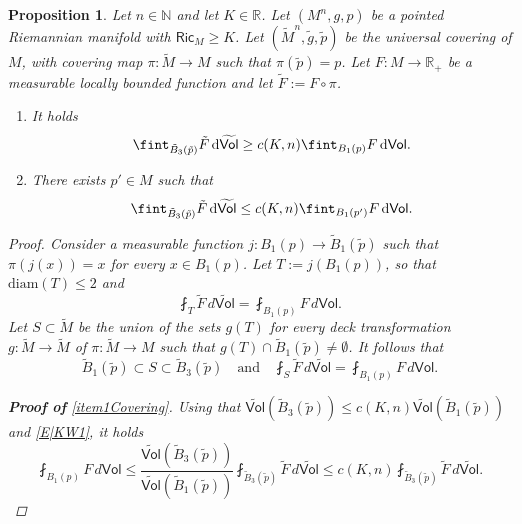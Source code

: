 \documentclass[10pt]{article}
\newtheorem{proposition}[thm]{Proposition}
\theoremstyle{definition}
\newcommand{\bb}[1]{\mathbb{#1}}
\newcommand{\ssf}[1]{\mathsf{#1}}
\newcommand{\Ric}{\mathsf{Ric}}
\newcommand{\de}{{\rm d}}
\begin{document}
\begin{proposition}\label{Prop:CoverInt}
    Let $n \in \bb{N}$ and let $K \in \bb{R}$. Let $(M^n,g,p)$ be a pointed Riemannian manifold with $\Ric_M \geq K$. Let $(\tilde{M}^n,\tilde{g},\tilde{p})$ be the universal covering of $M$, with covering map $\pi:\tilde{M} \to M$ such that $\pi(\tilde{p})=p$. Let $F:M \to \bb{R}_+$ be a measurable locally bounded function and let $\tilde{F}:=F \circ \pi$. 
    \begin{enumerate}
        \item \label{item1Covering}
        It holds
        \[
\fint_{\tilde{B}_3(\tilde{p})} 
    \tilde{F} \, \de\widetilde{\ssf{Vol}} \geq c(K,n) \fint_{B_1(p)} F \, \de\ssf{Vol}.
    \]
    \item \label{item2Covering}
    There exists $p' \in M$ such that
    \[
\fint_{\tilde{B}_3(\tilde{p})} 
    \tilde{F} \, \de\widetilde{\ssf{Vol}} \leq c(K,n) \fint_{B_1(p')} F \, \de\ssf{Vol}.
    \]
    \end{enumerate}
    \begin{proof}
Consider a measurable function $j:B_1(p) \to \tilde{B}_1(\tilde{p})$ such that $\pi(j(x))=x$ for every $x \in B_1(p)$. Let $T:=j(B_1(p))$, so that $\mathrm{diam}(T) \leq 2$ and 
\[
\fint_T \tilde{F} \, d\widetilde{\ssf{Vol}}=\fint_{B_1(p)}F \, d\ssf{Vol}.
\]
Let $S \subset \tilde{M}$ be the union of the sets $g(T)$ for every deck transformation $g:\tilde{M} \to \tilde{M}$ of $\pi:\tilde{M} \to M$ such that $g(T) \cap \tilde{B}_1(\tilde{p}) \neq \emptyset$. It follows that
\begin{equation} \label{E|KW1}
\tilde{B}_1(\tilde{p}) \subset S \subset \tilde{B}_3(\tilde{p}) \quad \text{and} \quad
\fint_S \tilde{F} \, d\widetilde{\ssf{Vol}}=\fint_{B_1(p)}F \, d\ssf{Vol}.
\end{equation}

\textbf{Proof of }\ref{item1Covering}. Using that $\widetilde{\ssf{Vol}}(\tilde{B}_3(\tilde{p})) \leq c(K,n) \widetilde{\ssf{Vol}}(\tilde{B}_1(\tilde{p}))$ and \eqref{E|KW1}, it holds
\[
\fint_{B_1(p)}F \, d\ssf{Vol} \leq \frac{\widetilde{\ssf{Vol}}(\tilde{B}_3(\tilde{p})) }{\widetilde{\ssf{Vol}}(\tilde{B}_1(\tilde{p}))}\fint_{\tilde{B}_3(\tilde{p})} \tilde{F} \, d\widetilde{\ssf{Vol}}
\leq c(K,n) \fint_{\tilde{B}_3(\tilde{p})} \tilde{F} \, d\widetilde{\ssf{Vol}}.
\]


\end{proof}
\end{proposition}
\end{document}
